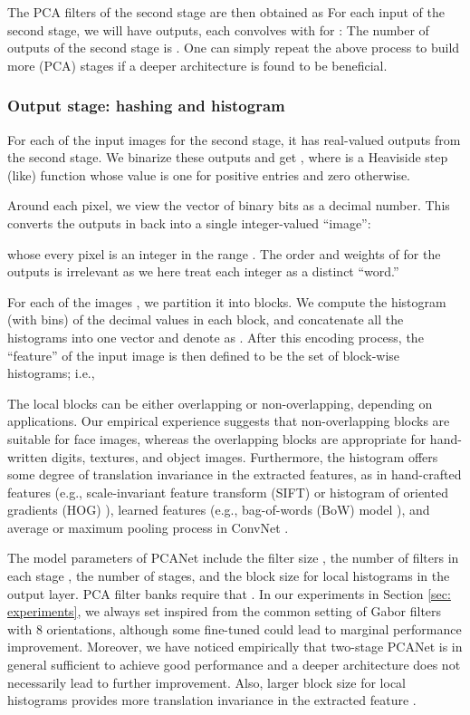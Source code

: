 \documentclass[10pt,journal,compsoc]{IEEEtran}
\begin{document}
The PCA filters of the second stage are then obtained as
For each input  of the second stage, we will have  outputs, each convolves  with  for :
The number of outputs of the second stage is . One can simply repeat the above process to build more (PCA) stages if a deeper architecture is found to be beneficial.

\subsubsection{\bf Output stage: hashing and histogram}
For each of the  input images  for the second stage, it has  real-valued outputs  from the second stage. We binarize these outputs and get , where  is a Heaviside step (like) function whose value is one for positive entries and zero otherwise.

Around each pixel, we view the vector of  binary bits as a decimal number. This converts the  outputs in  back into a single integer-valued ``image'':

whose every pixel is an integer in the range . The order and weights of for the  outputs is irrelevant as we here treat each integer as a distinct ``word.''

For each of the  images , we partition it into  blocks. We compute the histogram (with  bins) of the decimal values in each block, and concatenate all the  histograms into one vector and denote as . After this encoding process, the ``feature'' of the input image  is then defined to be the set of block-wise histograms; i.e.,

The local blocks can be either overlapping or non-overlapping, depending on applications. Our empirical experience suggests that non-overlapping blocks are suitable for face images, whereas the overlapping blocks are appropriate for hand-written digits, textures, and object images. Furthermore, the histogram offers some degree of translation invariance in the extracted features, as in hand-crafted features (e.g., scale-invariant feature transform (SIFT) \cite{Lowe2004} or histogram of oriented gradients (HOG) \cite{Dalal2005}), learned features (e.g., bag-of-words (BoW) model \cite{Fei2005}), and average or maximum pooling process in ConvNet \cite{LeCun1998, Jarrett2009, Kayukcuoglu2010, Goodfellow2013, Krizhevsky2012}.

The model parameters of PCANet include the filter size , the number of filters in each stage , the number of stages, and the block size for local histograms in the output layer. PCA filter banks require that . In our experiments in Section \ref{sec: experiments}, we always set  inspired from the common setting of Gabor filters \cite{Liu2002} with 8 orientations, although some fine-tuned  could lead to marginal performance improvement. Moreover, we have noticed empirically that two-stage PCANet is in general sufficient to achieve good performance and a deeper architecture does not necessarily lead to further improvement. Also, larger block size for local histograms provides more translation invariance in the extracted feature .
\end{document}
